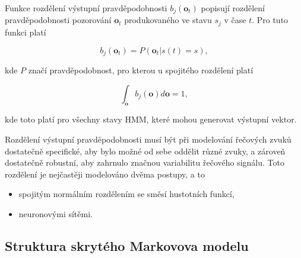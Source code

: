 \noindent Funkce rozdělení výstupní pravděpodobnosti $b_j\left(\boldsymbol{o}_t\right)$ popisují rozdělení pravděpodobnosti pozorování $\boldsymbol{o}_t$ produkovaného ve stavu $s_j$ v čase $t$. Pro tuto funkci platí

\begin{equation}
  b_j\left(\boldsymbol{o}_t\right) = P\left(\boldsymbol{o}_t|s\left(t\right)=s\right),
  \label{eq:asr:acoustic:state:output}
\end{equation}

\noindent kde $P$ značí pravděpodobnost, pro kterou u spojitého rozdělení platí

\begin{equation}
  \int_{\boldsymbol{o}} b_j\left(\boldsymbol{o}\right)d\boldsymbol{o} = 1,
  \label{eq:asr:acoustic:state:output:condition:continous}
\end{equation}

\noindent kde toto platí pro všechny stavy HMM, které mohou generovat výstupní vektor.






Rozdělení výstupní pravděpodobnosti musí být při modelování řečových zvuků dostatečně specifické, aby bylo možné od sebe oddělit různé zvuky, a zároveň dostatečně robustní, aby zahrnulo značnou variabilitu řečového signálu. Toto rozdělení je nejčastěji modelováno dvěma postupy, a to

\begin{itemize}
  \item spojitým normálním rozdělením se směsí hustotních funkcí,
  \item neuronovými sítěmi.
\end{itemize}

\subsection{Struktura skrytého Markovova modelu}
\label{chap:asr:acoustic:HMM}

